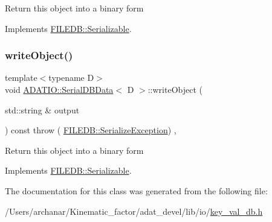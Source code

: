 Return this object into a binary form 

Implements \mbox{\hyperlink{classFILEDB_1_1Serializable_a8deaa86e108c08c863881e46cf5578ea}{F\+I\+L\+E\+D\+B\+::\+Serializable}}.

\mbox{\label{classADATIO_1_1SerialDBData_a5266e4f1c065f0776f9974d6fad51a2f}} 
\subsubsection{\texorpdfstring{writeObject()}{writeObject()}\hspace{0.1cm}{\footnotesize\ttfamily [2/2]}}
{\footnotesize\ttfamily template$<$typename D$>$ \\
void \mbox{\hyperlink{classADATIO_1_1SerialDBData}{A\+D\+A\+T\+I\+O\+::\+Serial\+D\+B\+Data}}$<$ D $>$\+::write\+Object (\begin{DoxyParamCaption}\item[{std\+::string \&}]{output }\end{DoxyParamCaption}) const throw ( \mbox{\hyperlink{classFILEDB_1_1SerializeException}{F\+I\+L\+E\+D\+B\+::\+Serialize\+Exception}}) \hspace{0.3cm}{\ttfamily [inline]}, {\ttfamily [virtual]}}

Return this object into a binary form 

Implements \mbox{\hyperlink{classFILEDB_1_1Serializable_a8deaa86e108c08c863881e46cf5578ea}{F\+I\+L\+E\+D\+B\+::\+Serializable}}.



The documentation for this class was generated from the following file\+:\begin{DoxyCompactItemize}
\item 
/\+Users/archanar/\+Kinematic\+\_\+factor/adat\+\_\+devel/lib/io/\mbox{\hyperlink{lib_2io_2key__val__db_8h}{key\+\_\+val\+\_\+db.\+h}}\end{DoxyCompactItemize}
